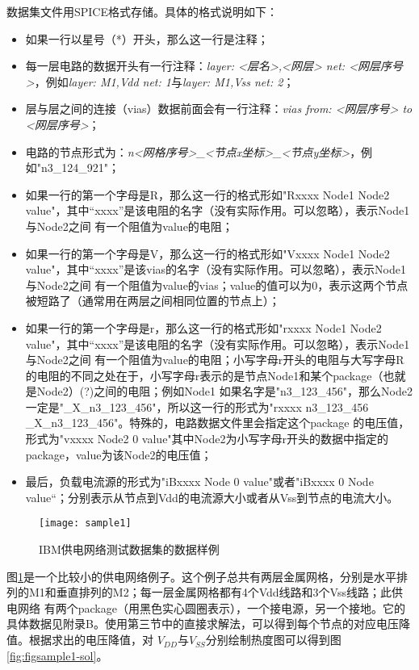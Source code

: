 数据集文件用SPICE格式存储。具体的格式说明如下：

\begin{itemize}
\item 如果一行以星号（*）开头，那么这一行是注释；
\item 每一层电路的数据开头有一行注释：\emph{layer: <层名>,<网层> net: <网层序号>}，例如\emph{layer: M1,Vdd net: 1}与\emph{layer: M1,Vss net: 2}；
\item 层与层之间的连接（vias）数据前面会有一行注释：\emph{vias from: <网层序号> to <网层序号>}；
\item 电路的节点形式为：\emph{n<网格序号>\_<节点x坐标>\_<节点y坐标>}，例如"n3\_124\_921"；
\item 如果一行的第一个字母是R，那么这一行的格式形如"Rxxxx Node1 Node2 value"，其中“xxxx”是该电阻的名字（没有实际作用。可以忽略），表示Node1与Node2之间
有一个阻值为value的电阻；
\item 如果一行的第一个字母是V，那么这一行的格式形如"Vxxxx Node1 Node2 value"，其中“xxxx”是该vias的名字（没有实际作用。可以忽略），表示Node1与Node2之间
有一个阻值为value的vias；value的值可以为0，表示这两个节点被短路了（通常用在两层之间相同位置的节点上）；
\item 如果一行的第一个字母是r，那么这一行的格式形如"rxxxx Node1 Node2 value"，其中“xxxx”是该电阻的名字（没有实际作用。可以忽略），表示Node1与Node2之间
有一个阻值为value的电阻；小写字母r开头的电阻与大写字母R的电阻的不同之处在于，小写字母r表示的是节点Node1和某个package（也就是Node2）(?)之间的电阻；例如Node1
如果名字是"n3\_123\_456"，那么Node2一定是"\_X\_n3\_123\_456"，所以这一行的形式为"rxxxx n3\_123\_456 \_X\_n3\_123\_456"。特殊的，电路数据文件里会指定这个package
的电压值，形式为"vxxxx Node2 0 value"其中Node2为小写字母r开头的数据中指定的package，value为该Node2的电压值；
\item 最后，负载电流源的形式为"iBxxxx Node 0 value"或者"iBxxxx 0 Node value“；分别表示从节点到Vdd的电流源大小或者从Vss到节点的电流大小。
\end{itemize}

\begin{figure}[H]
  \centering
  \texttt{[image: sample1]}
  \caption{IBM供电网络测试数据集的数据样例~\cite{nassif2008power}}
  \label{fig:figsample1}
\end{figure}

图\ref{fig:figsample1}是一个比较小的供电网络例子。这个例子总共有两层金属网格，分别是水平排列的M1和垂直排列的M2；每一层金属网格都有4个Vdd线路和3个Vss线路；此供电网络
有两个package（用黑色实心圆圈表示），一个接电源，另一个接地。它的具体数据见附录B。使用第三节中的直接求解法，可以得到每个节点的对应电压降值。根据求出的电压降值，对
$V_{DD}$与$V_{SS}$分别绘制热度图可以得到图\ref{fig:figsample1-sol}。

